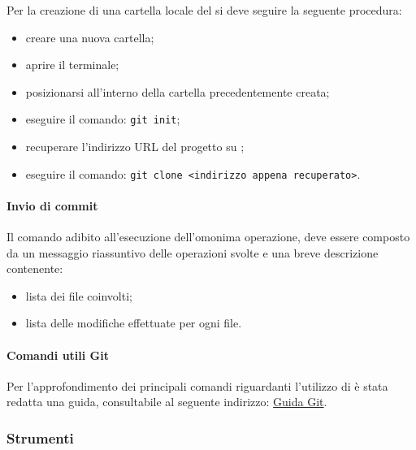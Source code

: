     		Per la creazione di una cartella locale del  si deve seguire la seguente procedura:
    		\begin{itemize}
    			\item creare una nuova cartella;
    			\item aprire il terminale;
    			\item posizionarsi all'interno della cartella precedentemente creata;
    			\item eseguire il comando: \texttt{git init};
    			\item recuperare l'indirizzo URL del progetto su ;
    			\item eseguire il comando: \texttt{git clone <indirizzo appena recuperato>}.
    		\end{itemize}

            \paragraph{Invio di commit}
            \label{commit}
    		Il comando \texttt{} adibito all'esecuzione dell'omonima operazione, deve essere composto da un messaggio riassuntivo delle operazioni svolte e una breve descrizione contenente:
    		\begin{itemize}
    			\item lista dei file coinvolti;
    			\item lista delle modifiche effettuate per ogni file.
    		\end{itemize}
    		\paragraph{Comandi utili Git}
    		Per l'approfondimento dei principali comandi riguardanti l'utilizzo di  è stata redatta una guida, consultabile al seguente indirizzo: \href{https://github.com/JordanGottardo/Documenti/blob/master/README.md}{Guida Git}.

    \subsubsection{Strumenti}
